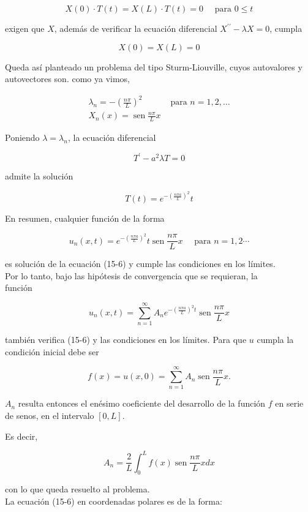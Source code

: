 \documentclass[10pt]{article}
\theoremstyle{plain}
\theoremstyle{definition}
\theoremstyle{remark}
\begin{document}
$$
X(0) \cdot T(t)=X(L) \cdot T(t)=0 \quad \text { para } 0 \leqslant t
$$

exigen que $X$, además de verificar la ecuación diferencial $X^{\prime \prime}-\lambda X=0$, cumpla

$$
X(0)=X(L)=0
$$

Queda así planteado un problema del tipo Sturm-Liouville, cuyos autovalores y autovectores son. como ya vimos,

$$
\begin{array}{ll}
\lambda_{n}=-\left(\frac{n \pi}{L}\right)^{2} & \text { para } n=1,2, \ldots \\
X_{n}(x)=\operatorname{sen} \frac{n \pi}{L} x &
\end{array}
$$

Poniendo $\lambda=\lambda_{n}$, la ecuación diferencial

$$
T^{\prime}-a^{2} \lambda T=0
$$

admite la solución

$$
T(t)=e^{-\left(\frac{n \pi a}{L}\right)^{2}} t
$$

En resumen, cualquier función de la forma

$$
u_{n}(x, t)=e^{-\left(\frac{n \pi a}{L}\right)^{2}} t \operatorname{sen} \frac{n \pi}{L} x \quad \text { para } n=1,2 \cdots
$$

es solución de la ecuación (15-6) y cumple las condiciones en los límites.\\
Por lo tanto, bajo las hipótesis de convergencia que se requieran, la\\
función

$$
u_{n}(x, t)=\sum_{n=1}^{\infty} A_{n} e^{-\left(\frac{n \pi a}{L}\right)^{2} t} \operatorname{sen} \frac{n \pi}{L} x
$$

también verifica (15-6) y las condiciones en los límites. Para que $u$ cumpla la condición inicial debe ser

$$
f(x)=u(x, 0)=\sum_{n=1}^{\infty} A_{n} \operatorname{sen} \frac{n \pi}{L} x .
$$

$A_{n}$ resulta entonces el enésimo coeficiente del desarrollo de la función $f$ en serie de senos, en el intervalo $[0, L]$.

Es decir,

$$
A_{n}=\frac{2}{L} \int_{0}^{L} f(x) \operatorname{sen} \frac{n \pi}{L} x d x
$$

con lo que queda resuelto al problema.\\
La ecuación (15-6) en coordenadas polares es de la forma:
\end{document}
